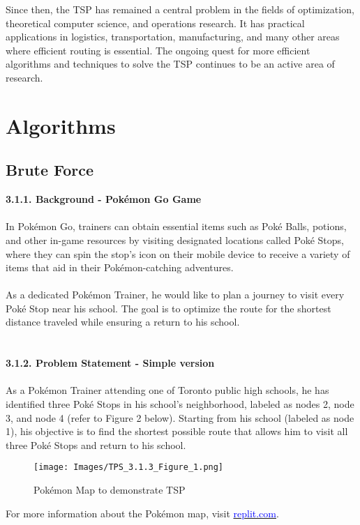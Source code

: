 \documentclass{article}
\begin{document}
Since then, the TSP has remained a central problem in the fields of optimization, theoretical computer science, and operations research. It has practical applications in logistics, transportation, manufacturing, and many other areas where efficient routing is essential. The ongoing quest for more efficient algorithms and techniques to solve the TSP continues to be an active area of research.


\section{Algorithms}
\subsection{Brute Force}    %

\textbf{3.1.1. Background - Pokémon Go Game}\\
\\In Pokémon Go, trainers can obtain essential items such as Poké Balls, potions, and other in-game resources by visiting designated locations called Poké Stops, where they can spin the stop's icon on their mobile device to receive a variety of items that aid in their Pokémon-catching adventures.
\\
\\
As a dedicated Pokémon Trainer, he would like to plan a journey to visit every Poké Stop near his school. The goal is to optimize the route for the shortest distance traveled while ensuring a return to his school.\\
\\
\\
\textbf{3.1.2. Problem Statement - Simple version}
\\
\\As a Pokémon Trainer attending one of Toronto public high schools, he has identified three Poké Stops in his school's neighborhood, labeled as nodes 2, node 3, and node 4 (refer to Figure 2 below). Starting from his school (labeled as node 1), his objective is to find the shortest possible route that allows him to visit all three Poké Stops and return to his school.

\begin{figure}
    \centering
    \texttt{[image: Images/TPS\_3.1.3\_Figure\_1.png]}
    \caption{Pokémon Map to demonstrate TSP}
\end{figure}
\FloatBarrier %
For more information about the Pokémon map, visit \href{https://03054ef6-cb1d-4246-a6a2-cfd6fdae8ad3-00-1zdo2iirgfaiv.kirk.replit.dev/}{\textcolor{blue}{replit.com}}. \cite{githubBruteforce}
\\
\end{document}
